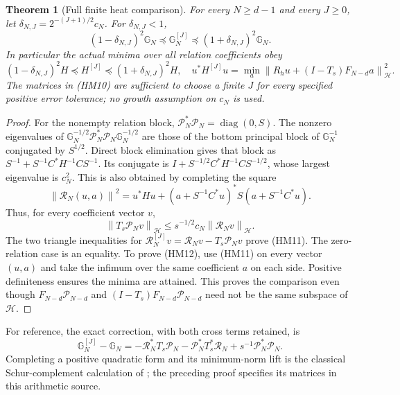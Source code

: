 \documentclass[11pt]{article}
\newcommand{\PP}{\mathcal P}\newcommand{\Hh}{\mathcal H}
\newcommand{\norm}[1]{\left\lVert#1\right\rVert}
\newtheorem{theorem}{Theorem}\newtheorem{lemma}[theorem]{Lemma}
\begin{document}
\begin{theorem}[Full finite heat comparison]
For every $N\ge d-1$ and every $J\ge0$, let
$\delta_{N,J}=2^{-(J+1)/2}c_N$. For $\delta_{N,J}<1$,
\begin{equation}\tag{HM11}
 (1-\delta_{N,J})^2\mathbb G_N
 \preceq\mathbb G_N^{[J]}
 \preceq(1+\delta_{N,J})^2\mathbb G_N.
\end{equation}
In particular the actual minima over all relation coefficients obey
\begin{equation}\tag{HM12}
 (1-\delta_{N,J})^2H\preceq H^{[J]}
                 \preceq(1+\delta_{N,J})^2H,
 \quad
 u^*H^{[J]}u=\min_a\norm{R_hu+(I-T_s)F_{N-d}a}_{\Hh}^2.
\end{equation}
The matrices in (HM10) are sufficient to choose a finite $J$ for every
specified positive error tolerance; no growth assumption on $c_N$ is used.
\end{theorem}
\begin{proof}
For the nonempty relation block,
$\mathcal P_N^*\mathcal P_N=\operatorname{diag}(0,S)$.
The nonzero eigenvalues of
$\mathbb G_N^{-1/2}\mathcal P_N^*\mathcal P_N\mathbb G_N^{-1/2}$
are those of the bottom principal block of $\mathbb G_N^{-1}$
conjugated by $S^{1/2}$. Direct block elimination gives that block as
$S^{-1}+S^{-1}C^*H^{-1}CS^{-1}$. Its conjugate is
$I+S^{-1/2}C^*H^{-1}CS^{-1/2}$, whose largest eigenvalue is $c_N^2$.
This is also obtained by completing the square
\[
 \norm{\mathcal R_N(u,a)}^2
 =u^*Hu+(a+S^{-1}C^*u)^*S(a+S^{-1}C^*u).
\]
Thus, for every coefficient vector $v$,
\begin{equation}\tag{HM13}
 \norm{T_s\mathcal P_Nv}_{\Hh}
 \le s^{-1/2}c_N\norm{\mathcal R_Nv}_{\Hh}.
\end{equation}
The two triangle inequalities for
$\mathcal R_N^{[J]}v=\mathcal R_Nv-T_s\mathcal P_Nv$
prove (HM11). The zero-relation case is an equality.
To prove (HM12), use (HM11) on every vector $(u,a)$ and take the
infimum over the same coefficient $a$ on each side. Positive definiteness
ensures the minima are attained. This proves the comparison even though
$F_{N-d}\PP_{N-d}$ and $(I-T_s)F_{N-d}\PP_{N-d}$ need not be the
same subspace of $\Hh$.
\end{proof}
For reference, the exact correction, with both cross terms retained, is
\begin{equation}\tag{HM14}
 \mathbb G_N^{[J]}-\mathbb G_N
 =-\mathcal R_N^*T_s\mathcal P_N
  -\mathcal P_N^*T_s^*\mathcal R_N+s^{-1}\mathcal P_N^*\mathcal P_N.
\end{equation}
Completing a positive quadratic form and its minimum-norm lift is the
classical Schur-complement calculation of \cite[Appendix C.4.1]{Boyd};
the preceding proof specifies its matrices in this arithmetic source.
\end{document}
